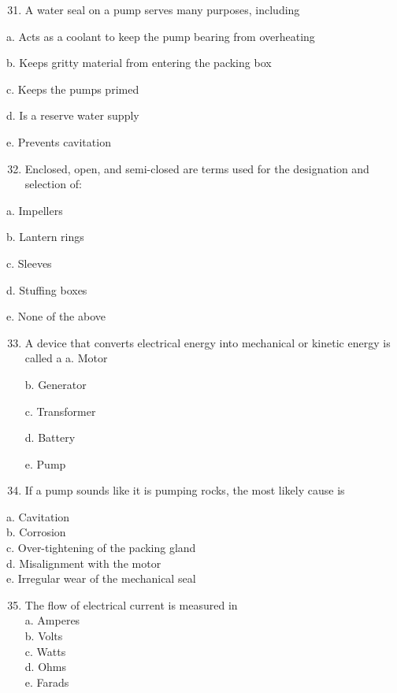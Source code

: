 \documentclass[10pt]{article}
\begin{document}
\begin{enumerate}
\begin{enumerate}
\begin{enumerate}
  \setcounter{enumi}{30}
  \item A water seal on a pump serves many purposes, including
\end{enumerate}

a. Acts as a coolant to keep the pump bearing from overheating

b. Keeps gritty material from entering the packing box

c. Keeps the pumps primed

d. Is a reserve water supply

e. Prevents cavitation

\begin{enumerate}
  \setcounter{enumi}{31}
  \item Enclosed, open, and semi-closed are terms used for the designation and selection of:
\end{enumerate}

a. Impellers

b. Lantern rings

c. Sleeves

d. Stuffing boxes

e. None of the above

\begin{enumerate}
  \setcounter{enumi}{32}
  \item A device that converts electrical energy into mechanical or kinetic energy is called a a. Motor


b. Generator

c. Transformer

d. Battery

e. Pump 

\item If a pump sounds like it is pumping rocks, the most likely cause is
\end{enumerate}
a. Cavitation\\
b. Corrosion\\
c. Over-tightening of the packing gland\\
d. Misalignment with the motor\\
e. Irregular wear of the mechanical seal\\

\begin{enumerate}
  \setcounter{enumi}{34}
  \item The flow of electrical current is measured in\\
a. Amperes\\
b. Volts\\
c. Watts\\
d. Ohms\\
e. Farads\\


\end{enumerate}
\end{enumerate}
\end{enumerate}
\end{document}
